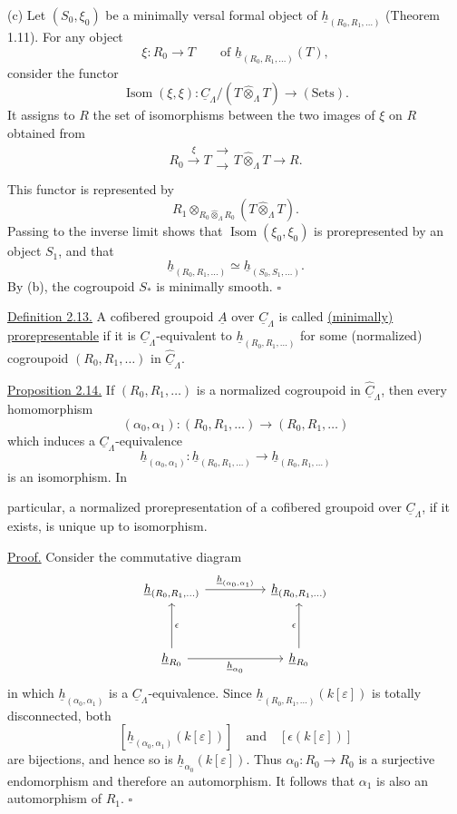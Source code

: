 (c) Let $(S_0,\xi_0)$ be a minimally versal formal object of
$\underline h_{(R_0,R_1,\ldots)}$ (Theorem 1.11). For any object
\[
 \xi:R_0\longrightarrow T
 \qquad\text{of }\underline h_{(R_0,R_1,\ldots)}(T),
\]
consider the functor
\[
 \operatorname{Isom}(\xi,\xi):
 \underline C_\Lambda/(T\widehat\otimes_\Lambda T)
 \longrightarrow(\mathrm{Sets}).
\]
It assigns to $R$ the set of isomorphisms between the two images of
$\xi$ on $R$ obtained from
\[
 R_0\xrightarrow{\ \xi\ }T
 \mathrel{\substack{\xrightarrow{}\\[-.6ex]\xrightarrow[]{}}}
 T\widehat\otimes_\Lambda T\longrightarrow R.
\]
This functor is represented by
\[
 R_1\otimes_{R_0\widehat\otimes_\Lambda R_0}
       (T\widehat\otimes_\Lambda T).
\]
Passing to the inverse limit shows that
$\operatorname{Isom}(\xi_0,\xi_0)$ is prorepresented by an object
$S_1$, and that
\[
 \underline h_{(R_0,R_1,\ldots)}
 \simeq\underline h_{(S_0,S_1,\ldots)}.
\]
By (b), the cogroupoid $S_*$ is minimally smooth. \hfill$\square$

\underline{Definition 2.13.} A cofibered groupoid $\underline A$
over $\underline C_\Lambda$ is called \underline{(minimally)
prorepresentable} if it is $\underline C_\Lambda$-equivalent to
$\underline h_{(R_0,R_1,\ldots)}$ for some (normalized) cogroupoid
$(R_0,R_1,\ldots)$ in $\widehat{\underline C}_\Lambda$.

\underline{Proposition 2.14.} If $(R_0,R_1,\ldots)$ is a normalized
cogroupoid in $\widehat{\underline C}_\Lambda$, then every
homomorphism
\[
 (\alpha_0,\alpha_1):(R_0,R_1,\ldots)
 \longrightarrow(R_0,R_1,\ldots)
\]
which induces a $\underline C_\Lambda$-equivalence
\[
 \underline h_{(\alpha_0,\alpha_1)}:
 \underline h_{(R_0,R_1,\ldots)}
 \longrightarrow\underline h_{(R_0,R_1,\ldots)}
\]
is an isomorphism. In


particular, a normalized prorepresentation of a cofibered groupoid
over $\underline C_\Lambda$, if it exists, is unique up to
isomorphism.

\underline{Proof.} Consider the commutative diagram
\[
\begin{tikzcd}[column sep=huge,row sep=huge]
 \underline h_{(R_0,R_1,\ldots)}
   \arrow[r,"{\underline h_{(\alpha_0,\alpha_1)}}"]
 & \underline h_{(R_0,R_1,\ldots)}\\
 \underline h_{R_0} \arrow[u,"\epsilon"']
   \arrow[r,"{\underline h_{\alpha_0}}"']
 & \underline h_{R_0} \arrow[u,"\epsilon"]
\end{tikzcd}
\]
in which $\underline h_{(\alpha_0,\alpha_1)}$ is a
$\underline C_\Lambda$-equivalence. Since
$\underline h_{(R_0,R_1,\ldots)}(k[\varepsilon])$ is totally
disconnected, both
\[
 [\underline h_{(\alpha_0,\alpha_1)}(k[\varepsilon])]
 \quad\text{and}\quad
 [\epsilon(k[\varepsilon])]
\]
are bijections, and hence so is
$\underline h_{\alpha_0}(k[\varepsilon])$. Thus
$\alpha_0:R_0\longrightarrow R_0$ is a surjective endomorphism and
therefore an automorphism. It follows that $\alpha_1$ is also an
automorphism of $R_1$. \hfill$\square$

